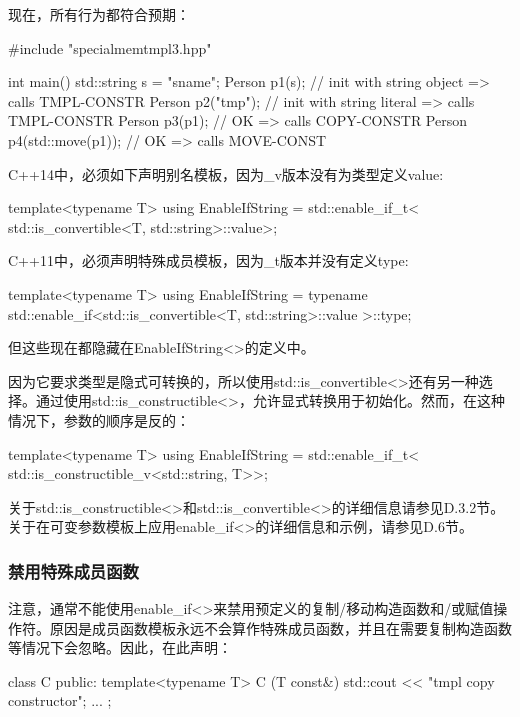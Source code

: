 现在，所有行为都符合预期：

\begin{cpp}
#include "specialmemtmpl3.hpp"

int main() {
	std::string s = "sname";
	Person p1(s); // init with string object => calls TMPL-CONSTR
	Person p2("tmp"); // init with string literal => calls TMPL-CONSTR
	Person p3(p1); // OK => calls COPY-CONSTR
	Person p4(std::move(p1)); // OK => calls MOVE-CONST
}
\end{cpp}

C++14中，必须如下声明别名模板，因为\_v版本没有为类型定义value:

\begin{cpp}
template<typename T>
using EnableIfString = std::enable_if_t<
						std::is_convertible<T, std::string>::value>;
\end{cpp}

C++11中，必须声明特殊成员模板，因为\_t版本并没有定义type:

\begin{cpp}
template<typename T>
using EnableIfString
= typename std::enable_if<std::is_convertible<T, std::string>::value
						>::type;
\end{cpp}

但这些现在都隐藏在EnableIfString<>的定义中。

因为它要求类型是隐式可转换的，所以使用std::is\_convertible<>还有另一种选择。通过使用std::is\_constructible<>，允许显式转换用于初始化。然而，在这种情况下，参数的顺序是反的：

\begin{cpp}
template<typename T>
using EnableIfString = std::enable_if_t<
						std::is_constructible_v<std::string, T>>;
\end{cpp}

关于std::is\_constructible<>和std::is\_convertible<>的详细信息请参见D.3.2节。关于在可变参数模板上应用enable\_if<>的详细信息和示例，请参见D.6节。

\subsubsection{禁用特殊成员函数}

注意，通常不能使用enable\_if<>来禁用预定义的复制/移动构造函数和/或赋值操作符。原因是成员函数模板永远不会算作特殊成员函数，并且在需要复制构造函数等情况下会忽略。因此，在此声明：

\begin{cpp}
class C {
public:
	template<typename T>
	C (T const&) {
		std::cout << "tmpl copy constructor\n";
	}
	...
};
\end{cpp}

